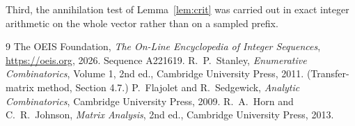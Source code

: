 \documentclass[11pt,a4paper]{article}
\theoremstyle{plain}
\theoremstyle{definition}
\begin{document}
Third, the annihilation test of Lemma~\ref{lem:crit} was carried out in exact integer
arithmetic on the whole vector rather than on a sampled prefix.

\begin{thebibliography}{9}
 The OEIS Foundation, \emph{The On-Line Encyclopedia of Integer
Sequences}, \url{https://oeis.org}, 2026. Sequence A221619.
 R.~P.~Stanley, \emph{Enumerative Combinatorics}, Volume 1, 2nd ed.,
Cambridge University Press, 2011. (Transfer-matrix method, Section 4.7.)
 P.~Flajolet and R.~Sedgewick, \emph{Analytic Combinatorics}, Cambridge
University Press, 2009.
 R.~A.~Horn and C.~R.~Johnson, \emph{Matrix Analysis}, 2nd ed., Cambridge
University Press, 2013.
\end{thebibliography}
\end{document}
